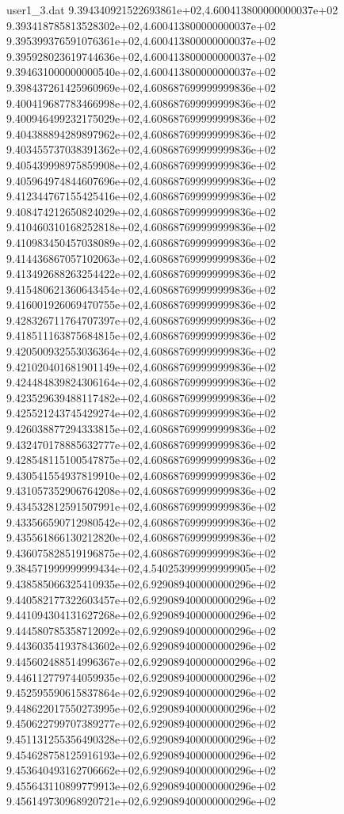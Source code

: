 \begin{filecontents}{user1_3.dat}
9.394340921522693861e+02,4.600413800000000037e+02
9.393418785813528302e+02,4.600413800000000037e+02
9.395399376591076361e+02,4.600413800000000037e+02
9.395928023619744636e+02,4.600413800000000037e+02
9.394631000000000540e+02,4.600413800000000037e+02
9.398437261425960969e+02,4.608687699999999836e+02
9.400419687783466998e+02,4.608687699999999836e+02
9.400946499232175029e+02,4.608687699999999836e+02
9.404388894289897962e+02,4.608687699999999836e+02
9.403455737038391362e+02,4.608687699999999836e+02
9.405439998975859908e+02,4.608687699999999836e+02
9.405964974844607696e+02,4.608687699999999836e+02
9.412344767155425416e+02,4.608687699999999836e+02
9.408474212650824029e+02,4.608687699999999836e+02
9.410460310168252818e+02,4.608687699999999836e+02
9.410983450457038089e+02,4.608687699999999836e+02
9.414436867057102063e+02,4.608687699999999836e+02
9.413492688263254422e+02,4.608687699999999836e+02
9.415480621360643454e+02,4.608687699999999836e+02
9.416001926069470755e+02,4.608687699999999836e+02
9.428326711764707397e+02,4.608687699999999836e+02
9.418511163875684815e+02,4.608687699999999836e+02
9.420500932553036364e+02,4.608687699999999836e+02
9.421020401681901149e+02,4.608687699999999836e+02
9.424484839824306164e+02,4.608687699999999836e+02
9.423529639488117482e+02,4.608687699999999836e+02
9.425521243745429274e+02,4.608687699999999836e+02
9.426038877294333815e+02,4.608687699999999836e+02
9.432470178885632777e+02,4.608687699999999836e+02
9.428548115100547875e+02,4.608687699999999836e+02
9.430541554937819910e+02,4.608687699999999836e+02
9.431057352906764208e+02,4.608687699999999836e+02
9.434532812591507991e+02,4.608687699999999836e+02
9.433566590712980542e+02,4.608687699999999836e+02
9.435561866130212820e+02,4.608687699999999836e+02
9.436075828519196875e+02,4.608687699999999836e+02
9.384571999999999434e+02,4.540253999999999905e+02
9.438585066325410935e+02,6.929089400000000296e+02
9.440582177322603457e+02,6.929089400000000296e+02
9.441094304131627268e+02,6.929089400000000296e+02
9.444580785358712092e+02,6.929089400000000296e+02
9.443603541937843602e+02,6.929089400000000296e+02
9.445602488514996367e+02,6.929089400000000296e+02
9.446112779744059935e+02,6.929089400000000296e+02
9.452595590615837864e+02,6.929089400000000296e+02
9.448622017550273995e+02,6.929089400000000296e+02
9.450622799707389277e+02,6.929089400000000296e+02
9.451131255356490328e+02,6.929089400000000296e+02
9.454628758125916193e+02,6.929089400000000296e+02
9.453640493162706662e+02,6.929089400000000296e+02
9.455643110899779913e+02,6.929089400000000296e+02
9.456149730968920721e+02,6.929089400000000296e+02

\end{filecontents}
